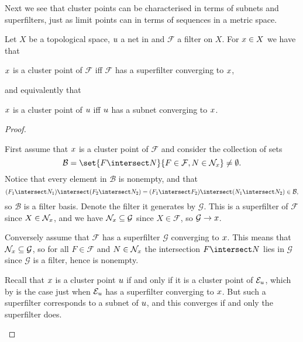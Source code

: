 \documentclass[article, a4paper, 11pt, oneside]{memoir}
\numberwithin{equation}{chapter}
\newcommand{\calB}{\mathcal{B}}
\newcommand{\calF}{\mathcal{F}}
\newcommand{\calG}{\mathcal{G}}
\theoremstyle{nonumberplain}
\begin{document}
Next we see that cluster points can be characterised in terms of subnets and superfilters, just as limit points can in terms of sequences in a metric space.

\begin{proposition}
    Let $X$ be a topological space, $\mynet$ a net in and $\calF$ a filter on $X$. For $\mylimit \in X$ we have that
    \begin{enumprop}
        \item \label{enum:superfilter-cluster} $\mylimit$ is a cluster point of $\calF$ iff $\calF$ has a superfilter converging to $\mylimit$,
    \end{enumprop}
    and equivalently that
    \begin{enumprop}[resume]
        \item \label{enum:subnet-cluster} $\mylimit$ is a cluster point of $\mynet$ iff $\mynet$ has a subnet converging to $\mylimit$.
    \end{enumprop}
\end{proposition}

\begin{proof}
\begin{proofsec}
    \item[\subcref{enum:superfilter-cluster}]
    First assume that $\mylimit$ is a cluster point of $\calF$ and consider the collection of sets
    \begin{equation*}
        \calB
            = \set{F \intersect N}{F \in \calF, N \in \nhoods{\mylimit}}
            \neq \emptyset.
    \end{equation*}
    Notice that every element in $\calB$ is nonempty, and that
    \begin{equation*}
        (F_1 \intersect N_1) \intersect (F_2 \intersect N_2)
            = (F_1 \intersect F_2) \intersect (N_1 \intersect N_2)
            \in \calB,
    \end{equation*}
    so $\calB$ is a filter basis. Denote the filter it generates by $\calG$. This is a superfilter of $\calF$ since $X \in \nhoods{\mylimit}$, and we have $\nhoods{\mylimit} \subseteq \calG$ since $X \in \calF$, so $\calG \to \mylimit$.

    Conversely assume that $\calF$ has a superfilter $\calG$ converging to $\mylimit$. This means that $\nhoods{\mylimit} \subseteq \calG$, so for all $F \in \calF$ and $N \in \nhoods{\mylimit}$ the intersection $F \intersect N$ lies in $\calG$ since $\calG$ is a filter, hence is nonempty.

    \item[\subcref{enum:subnet-cluster}]
    Recall that $\mylimit$ is a cluster point $\mynet$ if and only if it is a cluster point of $\evfilt[\mynet]$, which by  is the case just when $\evfilt[\mynet]$ has a superfilter converging to $\mylimit$. But such a superfilter corresponds to a subnet of $\mynet$, and this converges if and only the superfilter does.
\end{proofsec}
\end{proof}
\end{document}
